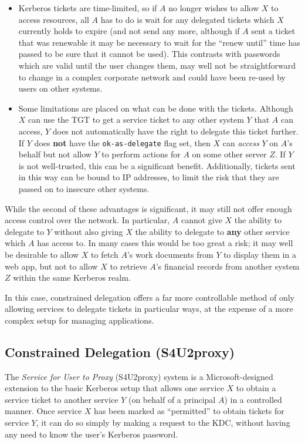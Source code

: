 \documentclass[12pt]{report}
\begin{document}
\begin{itemize}
\item
  Kerberos tickets are time-limited, so if $A$ no longer wishes to allow $X$ to access resources, all $A$ has to do is wait for any delegated tickets which $X$ currently holds to expire (and not send any more, although if $A$ sent a ticket that was renewable it may be necessary to wait for the ``renew until'' time has passed to be sure that it cannot be used). This contrasts with passwords which are valid until the user changes them, may well not be straightforward to change in a complex corporate network and could have been re-used by users on other systems.
\item
  Some limitations are placed on what can be done with the tickets. Although $X$ can use the TGT to get a service ticket to any other system $Y$ that $A$ can access, $Y$ does not automatically have the right to delegate this ticket further. If $Y$ does \textbf{not} have the \verb+ok-as-delegate+ flag set, then $X$ can \textit{access} $Y$ on $A$'s behalf but not allow $Y$ to perform actions for $A$ on some other server $Z$. If $Y$ is not well-trusted, this can be a significant benefit. Additionally, tickets sent in this way can be bound to IP addresses, to limit the risk that they are passed on to insecure other systems.
\end{itemize}

While the second of these advantages is significant, it may still not offer enough access control over the network. In particular, $A$ cannot give $X$ the ability to delegate to $Y$ without also giving $X$ the ability to delegate to \textbf{any} other service which $A$ has access to. In many cases this would be too great a risk; it may well be desirable to allow $X$ to fetch $A$'s work documents from $Y$ to display them in a web app, but not to allow $X$ to retrieve $A$'s financial records from another system $Z$ within the same Kerberos realm.

In this case, constrained delegation offers a far more controllable method of only allowing services to delegate tickets in particular ways, at the expense of a more complex setup for managing applications.

\subsection{Constrained Delegation (S4U2proxy)}
The \textit{Service for User to Proxy} (S4U2proxy) system is a Microsoft-designed extension to the basic Kerberos setup that allows one service $X$ to obtain a service ticket to another service $Y$ (on behalf of a principal $A$) in a controlled manner. Once service $X$ has been marked as ``permitted'' to obtain tickets for service $Y$, it can do so simply by making a request to the KDC, without having any need to know the user's Kerberos password\cite{MS-s4u2}.
\end{document}
